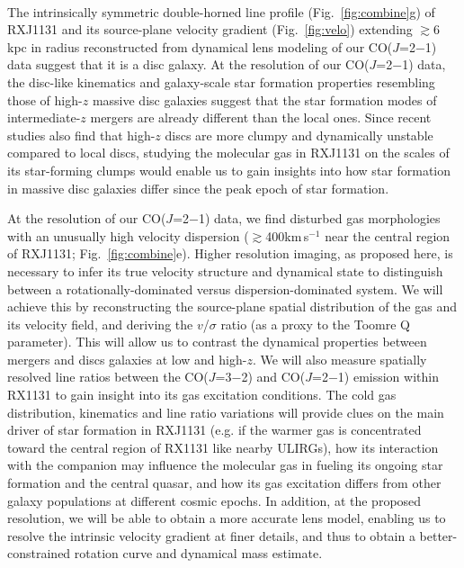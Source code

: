 \documentclass[11pt,a4paper,twoside,graphicx,color]{article}
\newcommand{\bco}{\mbox{CO($J$=2$-$1)}\xspace}
\newcommand{\cco}{\mbox{CO($J$=3$-$2)}\xspace}
\newcommand{\kms}{km\,s$^{-1}$\xspace}
\newcommand{\Fig}[1]{Fig.~\ref{fig:#1}}
\newcommand{\SF}{star formation\xspace}
\newcommand{\galpop}{galaxy populations\xspace}
\newcommand{\highz}{high-$z$\xspace}
\newcommand{\interz}{intermediate-$z$\xspace}
\begin{document}
\vspace{0.5em}
 \\
\indent The intrinsically symmetric double-horned line
profile (\Fig{combine}g) of RXJ1131 and its source-plane velocity gradient
(\Fig{velo}) extending $\gtrsim$6\,kpc in radius reconstructed from 
dynamical lens modeling of our \bco data suggest that it is a disc galaxy.
At the resolution of our \bco data, the disc-like kinematics and 
galaxy-scale \SF properties 
resembling those of \highz massive disc galaxies \citep{Daddi10a} suggest that 
the \SF modes of \interz mergers are already different than the local ones. 
Since recent studies also find that \highz discs are more clumpy and dynamically unstable compared to local discs, 
studying the molecular gas in RXJ1131 on the scales of its star-forming clumps
would enable us to gain insights into how \SF in massive disc galaxies differ since the peak epoch of \SF.

At the resolution of our \bco data, we find 
disturbed gas morphologies with an unusually high velocity dispersion ($\gtrsim$400\kms near the central region
of RXJ1131; \Fig{combine}e).
Higher resolution imaging, as proposed here, is necessary to infer its true velocity structure and dynamical state 
to distinguish between a rotationally-dominated versus dispersion-dominated system.
We will achieve this by reconstructing the source-plane spatial distribution of the gas and its velocity field, and
deriving the $v$/$\sigma$ ratio (as a proxy to the Toomre Q parameter).
This will allow us to contrast the dynamical properties between mergers and discs galaxies at low and \highz.
We will also measure spatially resolved line ratios between the \cco and \bco 
emission within RX1131 to gain insight into its gas excitation conditions.
The cold gas distribution, kinematics and line ratio variations will provide clues on
the main driver of \SF in RXJ1131 
 (e.g. if the warmer gas is
concentrated toward the central region of RX1131 like nearby ULIRGs), 
how its interaction with the companion may influence the molecular gas in fueling its ongoing \SF and the central quasar,
and how its gas excitation differs from other \galpop at different cosmic epochs.
In addition, at the proposed resolution, we will be able to obtain a more accurate lens model, enabling us
to resolve the intrinsic velocity gradient at finer details, and thus 
to obtain a better-constrained rotation curve and dynamical mass estimate.
\end{document}
